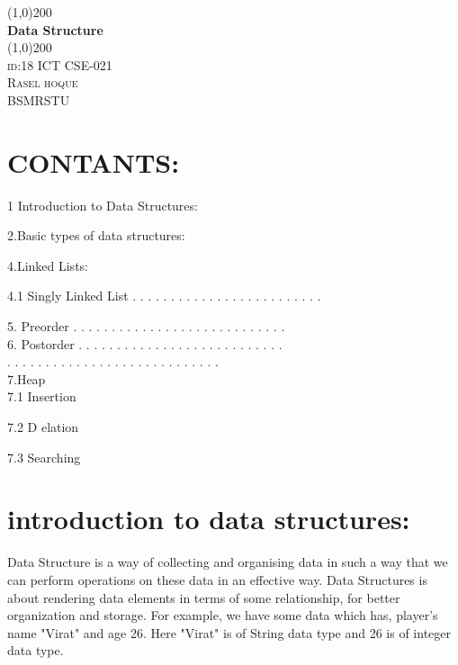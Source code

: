 \documentclass{article}
\begin{document}
   \begin{titlepage}
   \begin{center}
   \line(1,0){200}\\
   [0.25 in]
   \huge{\bfseries Data Structure}\\
   [2 mm]
   \line(1,0){200}\\
   \textsc{\large id:18 ICT CSE-021}\\
   [.2 cm]
   \textsc{\large Rasel hoque}\\
   [0.50 cm]
   \textsc{\LARGE BSMRSTU}\\
   [10 cm]
    \end{center}
   \end{titlepage}
   
   \section{CONTANTS:}\label{sec:cont}
   
 1 Introduction to Data Structures: 
   
 2.Basic types of data structures:
 
 4.Linked Lists: 

 4.1 Singly Linked List . . . . . . . . . . . . . . . . . . . . . . . . . 



5. Preorder . . . . . . . . . . . . . . . . . . . . . . . . . . . . \\


6. Postorder . . . . . . . . . . . . . . . . . . . . . . . . . . . \\ . . . . . . . . . . . . . . . . . . . . . . . . . . . . \\
7.Heap\\
7.1 Insertion

7.2 D elation

7.3 Searching

 
    \section{introduction to data structures:}\label{sec:intro}
   
   
   Data Structure is a way of collecting and organising data in such a way that we can perform operations on these data in an effective way. Data Structures is about rendering data elements in terms of some relationship, for better organization and storage. For example, we have some data which has, player's name "Virat" and age 26. Here "Virat" is of String data type and 26 is of integer data type.
   
\end{document}
